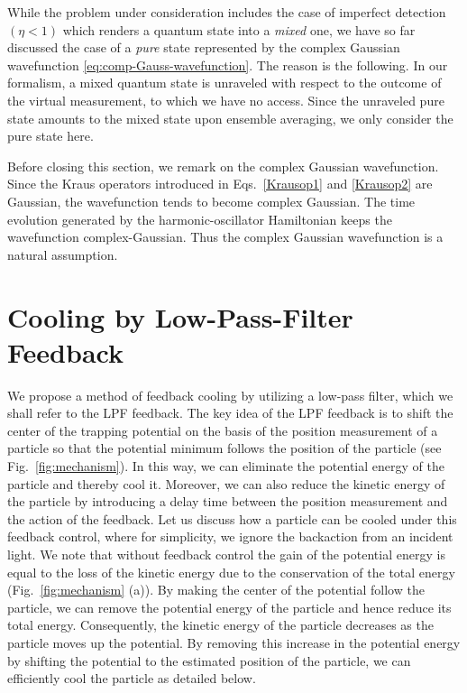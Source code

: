 \documentclass[aps,pra,superscriptaddress,twocolumn
]{revtex4-2}
\begin{document}
 {While the problem under consideration includes 
 the case of imperfect detection $(\eta < 1)$ 
 which renders a quantum state into a \textit{mixed} one, 
 we have so far discussed the case of a \textit{pure} state represented by the complex Gaussian wavefunction \eqref{eq:comp-Gauss-wavefunction}.
 The reason is the following. 
 In our formalism, 
 a mixed quantum state is unraveled with respect to the outcome of the virtual measurement, 
 to which we have no access. 
 Since the unraveled pure state 
 amounts to the mixed state upon ensemble averaging, 
 we only consider the pure state here.
 }
 
 Before closing this section, we remark on the complex Gaussian wavefunction.
 Since the Kraus operators introduced in Eqs.~\eqref{Krausop1} and \eqref{Krausop2} are Gaussian, 
 the wavefunction tends to become complex Gaussian.
 The time evolution generated by the harmonic-oscillator Hamiltonian keeps the wavefunction complex-Gaussian.
 Thus the complex Gaussian wavefunction is a natural assumption.
 
 
 
 
 
 
 
 
 
 
 
 
 
 
 
 
 
 \section{Cooling by Low-Pass-Filter Feedback}\label{sec:LPF}
 
 We propose a method of feedback cooling by utilizing a low-pass filter, 
 which we shall refer to the LPF feedback.
 The key idea of the LPF feedback is to shift the center of the trapping potential 
 on the basis of the position measurement of a particle 
 so that the potential minimum follows the position of the particle (see Fig.~\ref{fig:mechanism}).
 In this way, we can eliminate the potential energy of the particle and thereby cool it. 
 Moreover, we can also reduce the kinetic energy of the particle 
 by introducing a delay time between the position measurement and the action of the feedback.
 Let us discuss how a particle can be cooled under this feedback control,
 where for simplicity, we ignore the backaction from an incident light.
 We note that without feedback control 
 the gain of the potential energy is equal to the loss of the kinetic energy
 due to the conservation of the total energy (Fig.~\ref{fig:mechanism} (a)).
 By making the center of the potential follow the particle, 
 we can remove the potential energy of the particle and hence reduce its total energy. 
 Consequently, the kinetic energy of the particle decreases as the particle moves up the potential. 
 By removing this increase in the potential energy 
 by shifting the potential to the estimated position of the particle, 
 we can efficiently cool the particle as detailed below.
\end{document}
